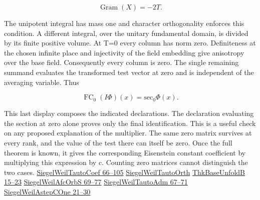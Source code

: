 \documentclass[11pt,letterpaper]{article}
\begin{document}
\[\operatorname{Gram}(X)=-2T .\]

The unipotent integral has mass one and character orthogonality enforces this condition. A different integral, over the unitary fundamental domain, is divided by its finite positive volume. At T=0 every column has norm zero. Definiteness at the chosen infinite place and injectivity of the field embedding give anisotropy over the base field. Consequently every column is zero. The single remaining summand evaluates the transformed test vector at zero and is independent of the averaging variable. Thus

\[\operatorname{FC}_0(I\Phi{})(x)=\mathrm{sec}_0\Phi{}(x).\]

This last display composes the indicated declarations. The declaration evaluating the section at zero alone proves only the final identification. This is a useful check on any proposed explanation of the multiplier. The same zero matrix survives at every rank, and the value of the test there can itself be zero. Once the full theorem is known, it gives the corresponding Eisenstein constant coefficient by multiplying this expression by c. Counting zero matrices cannot distinguish the two cases. \href{https://github.com/nousentllc/riemann-hypothesis/blob/40e56bab026552e089d7afcfeff08d2defb9c005/src/Development/AutomorphicArithmetic/Foundations/GaloisRepresentations/ThetaParseval/ThetaKernels/SiegelWeilTautoCoef.lean\#L66-L105}{SiegelWeilTautoCoef 66–105} \href{https://github.com/nousentllc/riemann-hypothesis/blob/40e56bab026552e089d7afcfeff08d2defb9c005/src/Development/AutomorphicArithmetic/Foundations/GaloisRepresentations/ThetaParseval/ThetaKernels/SiegelWeilTautoOrth.lean}{SiegelWeilTautoOrth} \href{https://github.com/nousentllc/riemann-hypothesis/blob/40e56bab026552e089d7afcfeff08d2defb9c005/src/Development/AutomorphicArithmetic/Foundations/GaloisRepresentations/ThetaParseval/ThetaKernels/ThkBaseUnfoldB.lean\#L15-L23}{ThkBaseUnfoldB 15–23} \href{https://github.com/nousentllc/riemann-hypothesis/blob/40e56bab026552e089d7afcfeff08d2defb9c005/src/Development/AutomorphicArithmetic/Foundations/GaloisRepresentations/ThetaParseval/ThetaKernels/SiegelWeilAfcOrbS.lean\#L69-L77}{SiegelWeilAfcOrbS 69–77} \href{https://github.com/nousentllc/riemann-hypothesis/blob/40e56bab026552e089d7afcfeff08d2defb9c005/src/Development/AutomorphicArithmetic/Foundations/GaloisRepresentations/ThetaParseval/ThetaKernels/SiegelWeilTautoAdm.lean\#L67-L71}{SiegelWeilTautoAdm 67–71} \href{https://github.com/nousentllc/riemann-hypothesis/blob/40e56bab026552e089d7afcfeff08d2defb9c005/src/Development/AutomorphicArithmetic/Foundations/GaloisRepresentations/ThetaParseval/ThetaKernels/SiegelWeilAstepCOne.lean\#L21-L30}{SiegelWeilAstepCOne 21–30}
\end{document}
